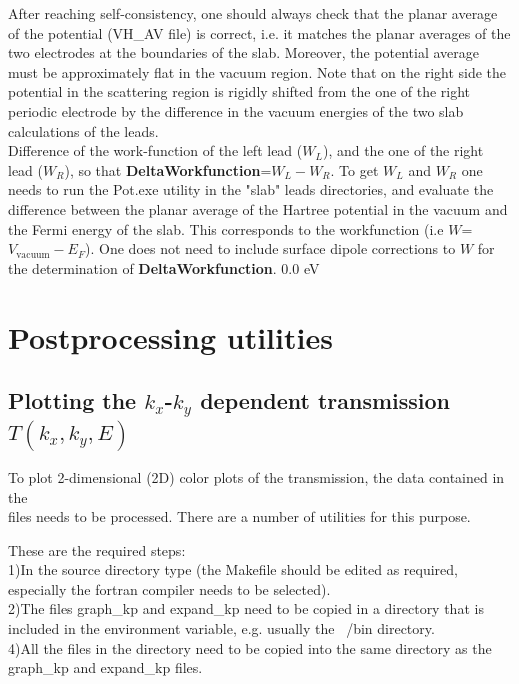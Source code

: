 \documentclass[11pt]{article}
\begin{document}
After reaching self-consistency, one should always check that the planar average of the potential (VH\_AV file) is correct, i.e. it matches the planar averages of the two electrodes at the boundaries of the slab. Moreover, the potential average must be approximately flat in the vacuum region. Note that on the right side the potential in the scattering region is rigidly shifted from the one of the right periodic electrode by the difference in the vacuum energies of the two slab calculations of the leads.\\


{Difference of the work-function of the left lead ($W_L$), and the one of the right lead ($W_R$), so that {\bf DeltaWorkfunction}=$W_L-W_R$.  
To get $W_L$ and $W_R$ one needs to run the Pot.exe utility in the "slab" leads directories, and evaluate the difference between the planar average of the Hartree potential in the vacuum and the Fermi energy of the slab. This corresponds to the workfunction (i.e $W$=$V_\mathrm{vacuum}-E_F$). One does not need to include surface dipole corrections to $W$ for the determination of {\bf DeltaWorkfunction}.
}
{0.0 eV}

\newpage
\section{Postprocessing utilities}
\subsection{Plotting the $k_x$-$k_y$ dependent transmission $T(k_x,k_y,E)$} 

To plot 2-dimensional (2D) color plots of the transmission, the data contained in the\\  files needs to be processed. There are a number of utilities for this purpose.

These are the required steps:\\
1)In the source directory  type  (the Makefile should be edited as required, especially the fortran compiler needs to be selected).\\
2)The files graph\_kp and expand\_kp need to be copied in a directory that is included in the  environment variable, e.g. usually the ~/bin directory.\\
4)All the files in the  directory need to be copied into the same directory as the graph\_kp and expand\_kp files.\\
\end{document}
